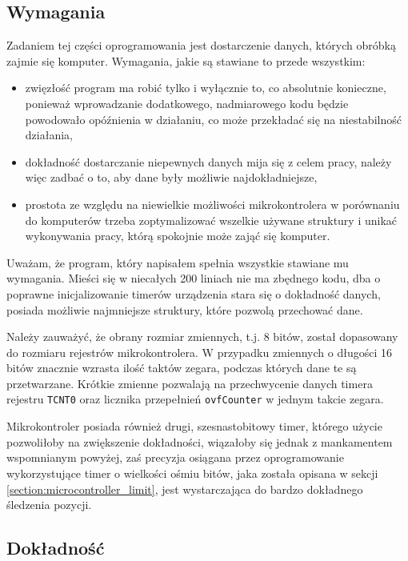 \subsection{Wymagania}
Zadaniem tej części oprogramowania jest dostarczenie danych, których obróbką zajmie się komputer. Wymagania, jakie są stawiane to przede wszystkim:
\begin{itemize}
 \item zwięzłość \ppauza program ma robić tylko i wyłącznie to, co absolutnie konieczne, ponieważ wprowadzanie dodatkowego, nadmiarowego kodu będzie powodowało opóźnienia w działaniu, co może przekładać się na
    niestabilność działania,
 \item dokładność \ppauza dostarczanie niepewnych danych mija się z celem pracy, należy więc zadbać o to, aby dane były możliwie najdokładniejsze,
 \item prostota \ppauza ze względu na niewielkie możliwości mikrokontrolera \ppauza w porównaniu do komputerów \ppauza trzeba zoptymalizować wszelkie używane struktury i unikać wykonywania pracy, którą spokojnie może zająć się komputer.
\end{itemize}

Uważam, że program, który napisałem spełnia wszystkie stawiane mu wymagania. Mieści się w niecałych 200 liniach \ppauza nie ma zbędnego kodu, dba o poprawne inicjalizowanie timerów urządzenia \ppauza stara się o dokładność danych, posiada możliwie najmniejsze struktury, które pozwolą przechować dane.

Należy zauważyć, że obrany rozmiar zmiennych, t.j. 8 bitów, został dopasowany do rozmiaru rejestrów mikrokontrolera. W przypadku zmiennych o długości 16 bitów znacznie wzrasta ilość taktów zegara, podczas których dane te są przetwarzane. Krótkie zmienne pozwalają na przechwycenie danych timera \ppauza rejestru \texttt{TCNT0} oraz licznika przepełnień \texttt{ovfCounter} \ppauza w jednym takcie zegara.

Mikrokontroler posiada również drugi, szesnastobitowy timer, którego użycie pozwoliłoby na zwiększenie dokładności, wiązałoby się jednak z mankamentem wspomnianym powyżej, zaś precyzja osiągana przez oprogramowanie wykorzystujące timer o wielkości ośmiu bitów, jaka została opisana w sekcji \ref{section:microcontroller_limit}, jest wystarczająca do bardzo dokładnego śledzenia pozycji.

\subsection{Dokładność}\label{section:precision}
